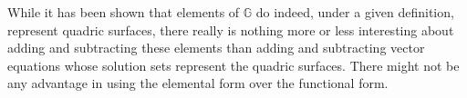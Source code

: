 \documentclass{ecgd-l}
\newcommand{\G}{\mathbb{G}}
\theoremstyle{definition}
\theoremstyle{remark}
\numberwithin{equation}{section}
\begin{document}
While it has been shown that elements of $\G$ do indeed, under a given
definition, represent quadric surfaces, there really is nothing more or less
interesting about adding and subtracting these elements than adding and
subtracting vector equations whose solution sets represent the quadric surfaces.
There might not be any advantage in using the elemental form over the
functional form.





\end{document}
